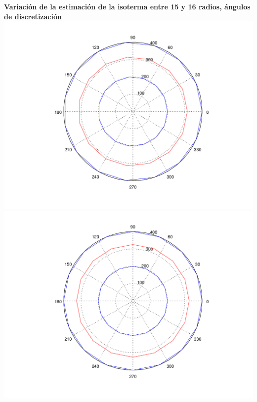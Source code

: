 \begin{enumerate}
	\vspace{0.5cm}
	  	\textbf{Variación de la estimación de la isoterma entre 15 y 16 radios, ángulos de discretización}\\
		\includegraphics[scale=0.35]{experimentos1a_1b/evolucion_posicion_isoterma_temperatura/variacion_radios_angulos_se_reduce_diferencia_radial/test11_testord_001_inst_001_isomap.png}
		\includegraphics[scale=0.35]{experimentos1a_1b/evolucion_posicion_isoterma_temperatura/variacion_radios_angulos_se_reduce_diferencia_radial/test11_testord_002_inst_001_isomap.png}


\end{enumerate}
